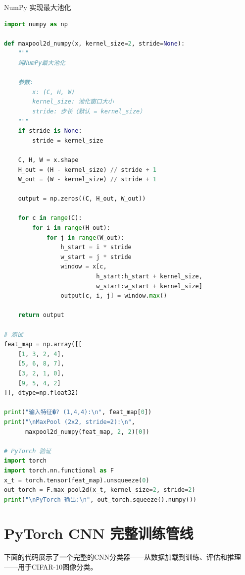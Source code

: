 \begin{mycode}{NumPy 实现最大池化}
\begin{lstlisting}[language=Python]
import numpy as np

def maxpool2d_numpy(x, kernel_size=2, stride=None):
    """
    纯NumPy最大池化

    参数:
        x: (C, H, W)
        kernel_size: 池化窗口大小
        stride: 步长（默认 = kernel_size）
    """
    if stride is None:
        stride = kernel_size

    C, H, W = x.shape
    H_out = (H - kernel_size) // stride + 1
    W_out = (W - kernel_size) // stride + 1

    output = np.zeros((C, H_out, W_out))

    for c in range(C):
        for i in range(H_out):
            for j in range(W_out):
                h_start = i * stride
                w_start = j * stride
                window = x[c,
                          h_start:h_start + kernel_size,
                          w_start:w_start + kernel_size]
                output[c, i, j] = window.max()

    return output

# 测试
feat_map = np.array([[
    [1, 3, 2, 4],
    [5, 6, 8, 7],
    [3, 2, 1, 0],
    [9, 5, 4, 2]
]], dtype=np.float32)

print("输入特征�? (1,4,4):\n", feat_map[0])
print("\nMaxPool (2x2, stride=2):\n",
      maxpool2d_numpy(feat_map, 2, 2)[0])

# PyTorch 验证
import torch
import torch.nn.functional as F
x_t = torch.tensor(feat_map).unsqueeze(0)
out_torch = F.max_pool2d(x_t, kernel_size=2, stride=2)
print("\nPyTorch 输出:\n", out_torch.squeeze().numpy())
\end{lstlisting}
\end{mycode}

\section{PyTorch CNN 完整训练管线}

下面的代码展示了一个完整的CNN分类器——从数据加载到训练、评估和推理——用于CIFAR-10图像分类。

